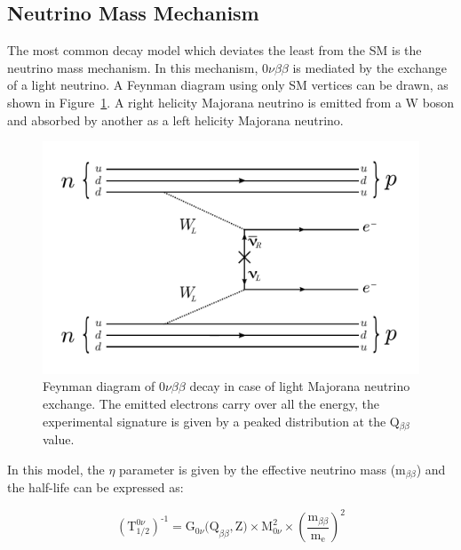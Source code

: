 \documentclass[main.tex]{subfiles}
\begin{document}
\FloatBarrier


\subsection{Neutrino Mass Mechanism}\label{sec:NMM}



\NI The most common decay model which deviates the least from the SM is the neutrino mass mechanism. In this mechanism, 0$\nu\beta\beta$ is mediated by the exchange of a light neutrino. A Feynman diagram using only SM vertices can be drawn, as shown in Figure~\ref{0nubbNMM}. A right helicity Majorana neutrino is emitted from a W boson and absorbed by another as a left helicity Majorana neutrino. 


\begin{figure}[h!]
\begin{center}
\includegraphics[scale=0.45]{pictures/Chap2/0nubbFeynmanDiagram_NMM.pdf}
\caption{Feynman diagram of 0$\nu\beta\beta$ decay in case of light Majorana neutrino exchange. The emitted electrons carry over all the energy, the experimental signature is given by a peaked distribution at the Q$_{\beta\beta}$ value.}
\label{0nubbNMM}
\end{center}
\end{figure}


\NI In this model, the $\eta$ parameter is given by the effective neutrino mass (m$_{\beta\beta}$) and the half-life can be expressed as: 


\begin{equation}\label{eq:HalfLife0nuParam}
(\text{T}_{\text{1/2}}^{\text{0}\nu})^{\text{-1}} = \text{G}_{\text{0}\nu}\text{(Q}_{\beta\beta},\text{Z)} \times \text{M}^\text{2}_{\text{0}\nu} \times \left( \frac{\text{m}_{\beta\beta}}{\text{m}_\text{e}} \right)^\text{2}
\end{equation}
\end{document}
